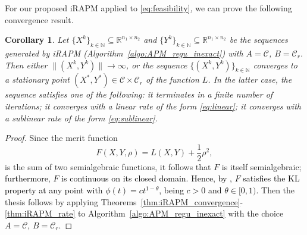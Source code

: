 \documentclass[pdflatex,sn-mathphys-num]{sn-jnl}
\numberwithin{equation}{section}%
\def\R{\mathbb{R}}
\newcommand{\setRank}{{\mathcal{C}_r}}
\newcommand{\setNorm}{{\mathcal{C} }}
\newcommand{\REV}[1]{\textcolor{black}{#1}}
\theoremstyle{thmstyleone}%
\newtheorem{corollary}[theorem]{Corollary}%
\theoremstyle{thmstyletwo}%
\theoremstyle{thmstylethree}%
\begin{document}
{
For our proposed iRAPM applied to \eqref{eq:feasibility}, we can prove the following convergence result.}

\begin{corollary}\label{th:iRAPM_MC}
    Let $\{X^k\}_{k\in\mathbb{N}}\subseteq \R^{n_1\times n_2}$ and $\{Y^k\}_{k\in\mathbb{N}}\subseteq \R^{n_1\times n_2}$ be the sequences generated by iRAPM (Algorithm~\ref{algo:APM_regu_inexact}) with $A=\setNorm$, $B=\setRank$. Then either $\|(X^k,Y^k)\|\rightarrow \infty$, or the sequence $\{(X^k,Y^k)\}_{k\in\mathbb{N}}$ converges to a stationary point $(X^*,Y^*)\in\mathcal{C} \times \mathcal{C}_r$ of the function $L$. {In the latter case, the sequence satisfies one of the following: it terminates in a finite number of iterations; it converges with a linear rate of the form \eqref{eq:linear}; it converges with a sublinear rate of the form \eqref{eq:sublinear}.}
\end{corollary}

\begin{proof}
Since the merit function 
\begin{equation}\label{eq:FXYR}
F(X,Y,\rho)=L(X,Y)+\frac{1}{2}\rho^2,
\end{equation}
is the sum of two semialgebraic functions, it follows that $F$ is itself semialgebraic; \REV{furthermore, $F$ is continuous on its closed domain. Hence, by \cite[Theorem 3.1]{Bolte2007}, $F$ satisfies the KL property at any point with $\phi(t)=ct^{1-\theta}$, being $c>0$ and $\theta\in[0,1)$.} Then the thesis follows by applying Theorems~\ref{thm:iRAPM_convergence}-\ref{thm:iRAPM_rate} to Algorithm~\ref{algo:APM_regu_inexact} with the choice $A=\setNorm$, $B=\setRank$.
\end{proof}
\end{document}
